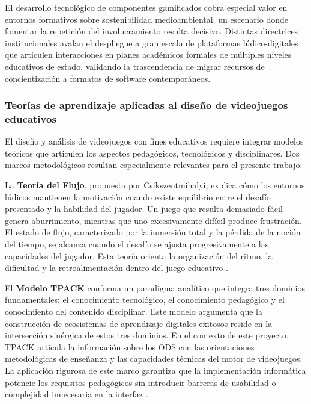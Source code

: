 El desarrollo tecnológico de componentes gamificados cobra especial valor en entornos formativos sobre sostenibilidad medioambiental, un escenario donde fomentar la repetición del involucramiento resulta decisivo. Distintas directrices institucionales \parencite{EuropeanCouncil2022} avalan el despliegue a gran escala de plataformas lúdico-digitales que articulen interacciones en planes académicos formales de múltiples niveles educativos de estado, validando la trascendencia de migrar recursos de concientización a formatos de software contemporáneos.

\subsubsection{Teorías de aprendizaje aplicadas al diseño de videojuegos educativos}
\label{subsubsec:teorias_aprendizaje}

El diseño y análisis de videojuegos con fines educativos requiere integrar modelos teóricos que articulen los aspectos pedagógicos, tecnológicos y disciplinares. Dos marcos metodológicos resultan especialmente relevantes para el presente trabajo:

La \textbf{Teoría del Flujo}, propuesta por Csikszentmihalyi, explica cómo los entornos lúdicos mantienen la motivación cuando existe equilibrio entre el desafío presentado y la habilidad del jugador. Un juego que resulta demasiado fácil genera aburrimiento, mientras que uno excesivamente difícil produce frustración. El estado de flujo, caracterizado por la inmersión total y la pérdida de la noción del tiempo, se alcanza cuando el desafío se ajusta progresivamente a las capacidades del jugador. Esta teoría orienta la organización del ritmo, la dificultad y la retroalimentación dentro del juego educativo \parencite{Csikszentmihalyi1990}.

El \textbf{Modelo TPACK} conforma un paradigma analítico que integra tres dominios fundamentales: el conocimiento tecnológico, el conocimiento pedagógico y el conocimiento del contenido disciplinar. Este modelo argumenta que la construcción de ecosistemas de aprendizaje digitales exitosos reside en la intersección sinérgica de estos tres dominios. En el contexto de este proyecto, TPACK articula la información sobre los ODS con las orientaciones metodológicas de enseñanza y las capacidades técnicas del motor de videojuegos. La aplicación rigurosa de este marco garantiza que la implementación informática potencie los requisitos pedagógicos sin introducir barreras de usabilidad o complejidad innecesaria en la interfaz \parencite{MishraKoehler2006}.


